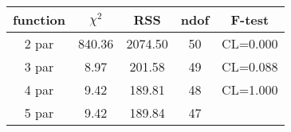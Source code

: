 \begin{tabular}{c|c|c|c|c}
function & $\chi^2$ & RSS & ndof & F-test \\
\hline
2 par & 840.36 & 2074.50 & 50 & CL=0.000 \\
3 par & 8.97 & 201.58 & 49 & CL=0.088 \\
4 par & 9.42 & 189.81 & 48 & CL=1.000 \\
5 par & 9.42 & 189.84 & 47 & \\
\hline
\end{tabular}